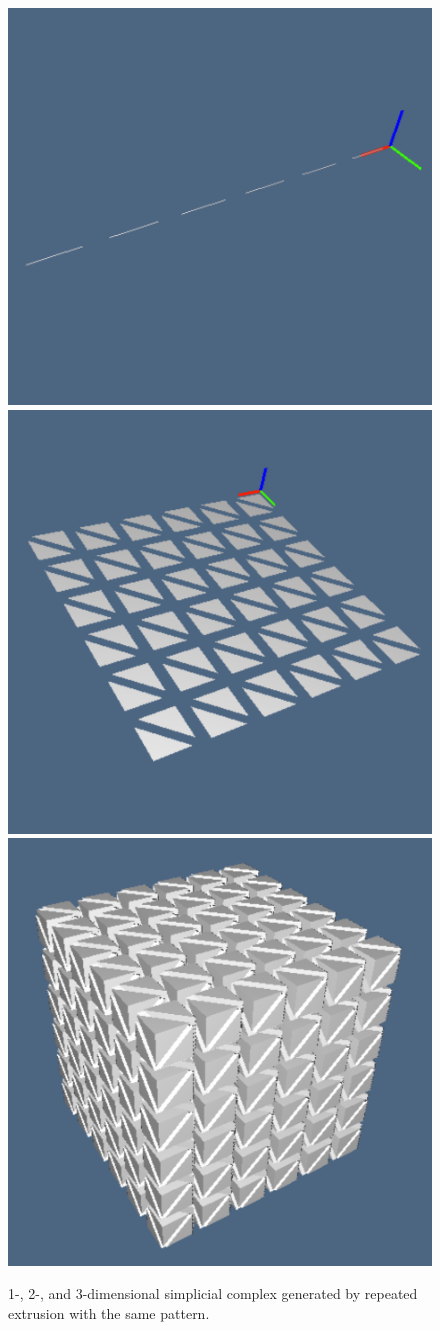 \documentclass[11pt,oneside]{article}	%
\begin{document}
\begin{figure}[htbp] %
   \centering
   \includegraphics[height=0.25\linewidth,width=0.25\linewidth]{images/simplexn-1a} 
   \includegraphics[height=0.25\linewidth,width=0.25\linewidth]{images/simplexn-1b} 
   \includegraphics[height=0.25\linewidth,width=0.25\linewidth]{images/simplexn-1c} 
   \caption{1-, 2-, and 3-dimensional simplicial complex generated by repeated extrusion with the same pattern.}
   \label{fig:example}
\end{figure}
\end{document}
